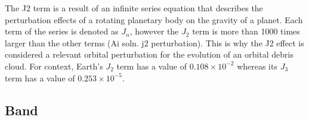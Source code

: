 \documentclass{article}
\makeatletter
\renewcommand\section{\clearpage\newpage\@startsection {section}{1}{\z@}%
	{-3.5ex \@plus -1ex \@minus -.2ex}%
	{2.3ex \@plus.2ex}%
	{\normalfont\Large\bfseries}}
\makeatother
\begin{document}
The J2 term is a result of an infinite series equation that describes the perturbation effects of a rotating planetary body on the gravity of a planet. Each term of the series is denoted as $J_n$, however the $J_2$ term is more than 1000 times larger than the other terms (Ai soln. j2 perturbation). This is why the J2 effect is considered a relevant orbital perturbation for the evolution of an orbital debris cloud. For context, Earth's  $J_2$ term has a value of $0.108 \times 10^{-2}$ whereas its $J_3$ term has a value of $0.253 \times 10^{-5}$.





\subsection{Band}









%
%
%



\end{document}
